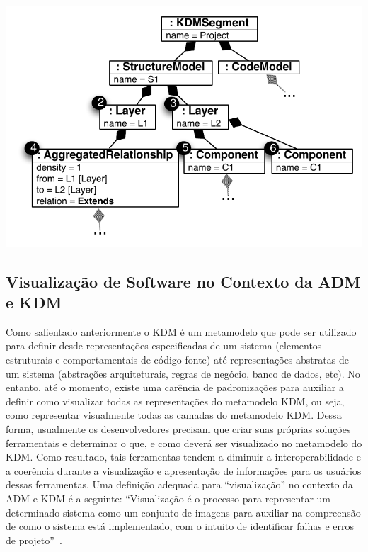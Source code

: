 \documentclass[12pt]{article}
\begin{document}
\begin{minipage}{.64\textwidth}
	\centering
	\includegraphics[scale=0.65]{StructureKDMINstance}
	\label{fig:kdm_instance_StructureExample}
\end{minipage}

\subsection{Visualização de Software no Contexto da ADM e KDM}

Como salientado anteriormente o KDM é um metamodelo que pode ser utilizado para definir desde representações especificadas de um sistema (elementos estruturais e comportamentais de código-fonte) até representações abstratas de um sistema (abstrações arquiteturais, regras de negócio, banco de dados, etc). No entanto, até o momento, existe uma carência de padronizações para auxiliar a definir como visualizar todas as representações do metamodelo KDM, ou seja, como representar visualmente todas as camadas do metamodelo KDM. Dessa forma, usualmente os desenvolvedores precisam que criar suas próprias soluções ferramentais e determinar o que, e como deverá ser visualizado no metamodelo do KDM. Como resultado, tais ferramentas tendem a diminuir a interoperabilidade e a coerência durante a visualização e apresentação de informações para os usuários dessas ferramentas. Uma definição adequada para ``visualização'' no contexto da ADM e KDM é a seguinte: ``Visualização é o processo para representar um determinado sistema como um conjunto de imagens para auxiliar na compreensão de como o sistema está implementado, com o intuito de identificar falhas e erros de projeto''~\cite{ADM:OMG}.
\end{document}
